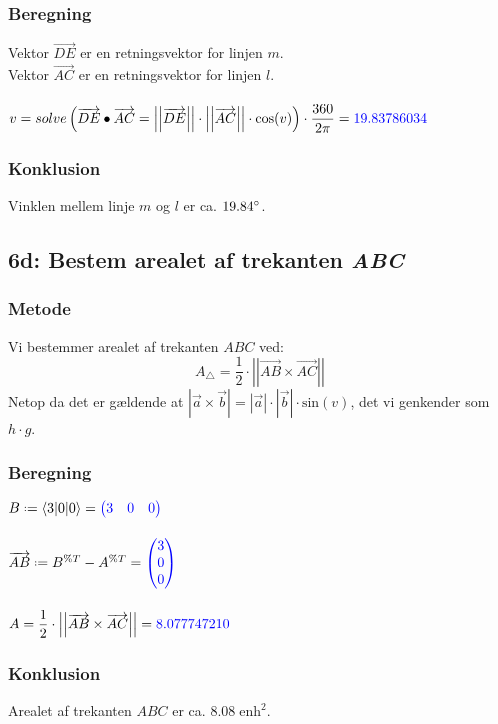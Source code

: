 \documentclass[../main.tex]{subfiles}
\begin{document}
    \subsubsection*{Beregning}
        Vektor \(\overrightarrow{DE}\) er en retningsvektor for linjen \(m\).\\
        Vektor \(\overrightarrow{AC}\) er en retningsvektor for linjen \(l\).\\\\
        \(\displaystyle v = solve\left(\overrightarrow{DE} \bullet \overrightarrow{AC} = \left|\left|\overrightarrow{DE} \right|\right| \cdot \left|\left|\overrightarrow{AC} \right|\right|\cdot \text{cos} (v)\right) \cdot \frac{360}{2\pi} = \textcolor{blue}{19.83786034}\)
    \subsubsection*{Konklusion}
        Vinklen mellem linje \(m\) og \(l\) er ca.  \(19.84\degree\).
\vspace*{1.5 cm}
\subsection*{6d: Bestem arealet af trekanten \textit{ABC}}
    \subsubsection*{Metode}
        Vi bestemmer arealet af trekanten \(ABC\) ved:
        \[A_\triangle=\frac{1}{2} \cdot \left|\left| \overrightarrow{AB} \times \overrightarrow{AC}\right|\right|\]
        Netop da det er gældende at \(\displaystyle \left|\overrightarrow{a} \times \overrightarrow{b} \right|=\left|\overrightarrow{a}\right|\cdot \left|\overrightarrow{b} \right|\cdot \text{sin}(v)\), det vi genkender som \(h\cdot g\). 
    \subsubsection*{Beregning}
        \(B \defeq \langle 3 | 0 | 0 \rangle = \textcolor{blue}{\begin{pmatrix} 3 & 0 & 0 \end{pmatrix}}\)\\\\
        \(\overrightarrow{AB} \defeq B^{\%T}-A^{\%T} = \textcolor{blue}{\begin{pmatrix} 3\\0\\0 \end{pmatrix}}\)\\\\
        \(\displaystyle A=\frac{1}{2}\cdot \left|\left| \overrightarrow{AB} \times \overrightarrow{AC}\right|\right| = \textcolor{blue}{8.077747210}\)
    \subsubsection*{Konklusion}
        Arealet af trekanten \(ABC\) er ca.  \(8.08 \;\text{enh}^2\).
\end{document}

